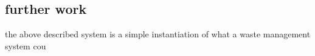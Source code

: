 
\subsection{further work}
the above described system is a simple instantiation of what a waste management system cou